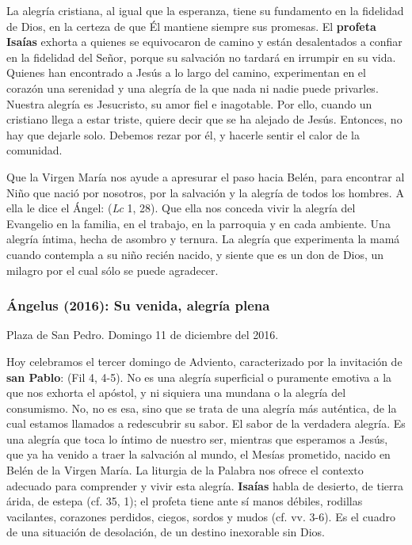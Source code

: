La alegría cristiana, al igual que la esperanza, tiene su fundamento en la fidelidad de Dios, en la certeza de que Él mantiene siempre sus promesas. El \textbf{profeta Isaías} exhorta a quienes se equivocaron de camino y están desalentados a confiar en la fidelidad del Señor, porque su salvación no tardará en irrumpir en su vida. Quienes han encontrado a Jesús a lo largo del camino, experimentan en el corazón una serenidad y una alegría de la que nada ni nadie puede privarles. Nuestra alegría es Jesucristo, su amor fiel e inagotable. Por ello, cuando un cristiano llega a estar triste, quiere decir que se ha alejado de Jesús. Entonces, no hay que dejarle solo. Debemos rezar por él, y hacerle sentir el calor de la comunidad.

Que la Virgen María nos ayude a apresurar el paso hacia Belén, para encontrar al Niño que nació por nosotros, por la salvación y la alegría de todos los hombres. A ella le dice el Ángel:  (\emph{Lc} 1, 28). Que ella nos conceda vivir la alegría del Evangelio en la familia, en el trabajo, en la parroquia y en cada ambiente. Una alegría íntima, hecha de asombro y ternura. La alegría que experimenta la mamá cuando contempla a su niño recién nacido, y siente que es un don de Dios, un milagro por el cual sólo se puede agradecer.

\subsubsection{Ángelus (2016): Su venida, alegría plena}

Plaza de San Pedro. Domingo 11 de diciembre del 2016.

Hoy celebramos el tercer domingo de Adviento, caracterizado por la invitación de \textbf{san Pablo}:  (Fil 4, 4-5). No es una alegría superficial o puramente emotiva a la que nos exhorta el apóstol, y ni siquiera una mundana o la alegría del consumismo. No, no es esa, sino que se trata de una alegría más auténtica, de la cual estamos llamados a redescubrir su sabor. El sabor de la verdadera alegría. Es una alegría que toca lo íntimo de nuestro ser, mientras que esperamos a Jesús, que ya ha venido a traer la salvación al mundo, el Mesías prometido, nacido en Belén de la Virgen María. La liturgia de la Palabra nos ofrece el contexto adecuado para comprender y vivir esta alegría. \textbf{Isaías} habla de desierto, de tierra árida, de estepa (cf. 35, 1); el profeta tiene ante sí manos débiles, rodillas vacilantes, corazones perdidos, ciegos, sordos y mudos (cf. vv. 3-6). Es el cuadro de una situación de desolación, de un destino inexorable sin Dios.

